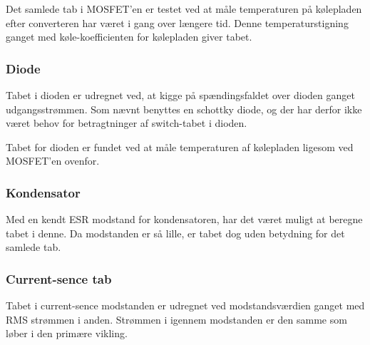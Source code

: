 Det samlede tab i MOSFET'en er testet ved at måle temperaturen på kølepladen efter converteren har været i gang over længere tid. Denne temperaturstigning ganget med køle-koefficienten for kølepladen giver tabet. 

\subsubsection{Diode}
Tabet i dioden er udregnet ved, at kigge på spændingsfaldet over dioden ganget udgangsstrømmen. Som nævnt benyttes en schottky diode, og der har derfor ikke været behov for betragtninger af switch-tabet i dioden. 

Tabet for dioden er fundet ved at måle temperaturen af kølepladen ligesom ved MOSFET'en ovenfor.   

\subsubsection{Kondensator}
Med en kendt ESR modstand for kondensatoren, har det været muligt at beregne tabet i denne. Da modstanden er så lille, er tabet dog uden betydning for det samlede tab.

\subsubsection{Current-sence tab}
Tabet i current-sence modstanden er udregnet ved modstandsværdien ganget med RMS strømmen i anden. Strømmen i igennem modstanden er den samme som løber i den primære vikling. 